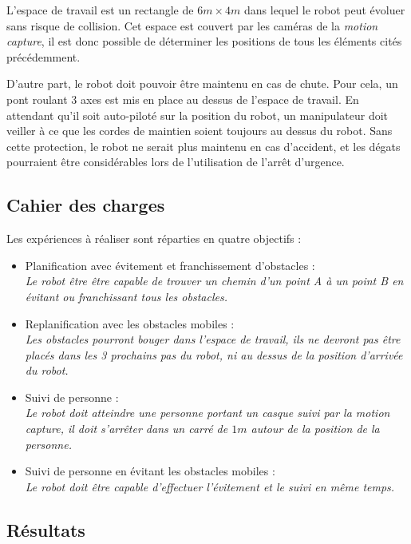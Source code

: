 L'espace de travail est un rectangle de $6m\times4m$ dans lequel le robot peut évoluer sans risque de collision. Cet espace est couvert par les caméras de la \emph{motion capture}, il est donc possible de déterminer les positions de tous les éléments cités précédemment. 

D'autre part, le robot doit pouvoir être maintenu en cas de chute. Pour cela, un pont roulant 3 axes est mis en place au dessus de l'espace de travail. En attendant qu'il soit auto-piloté sur la position du robot, un manipulateur doit veiller à ce que les cordes de maintien soient toujours au dessus du robot. Sans cette protection, le robot ne serait plus maintenu en cas d'accident, et les dégats pourraient être considérables lors de l'utilisation de l'arrêt d'urgence.

\subsection{Cahier des charges}
\label{sub:cdc}

Les expériences à réaliser sont réparties en quatre objectifs :
\begin{itemize}
\item Planification avec évitement et franchissement d'obstacles :\\
\emph{Le robot être être capable de trouver un chemin d'un point A à un point B en évitant ou franchissant tous les obstacles.}
\item Replanification avec les obstacles mobiles :\\
\emph{Les obstacles pourront bouger dans l'espace de travail, ils ne devront pas être placés dans les 3 prochains pas du robot, ni au dessus de la position d'arrivée du robot.}
\item Suivi de personne :\\
\emph{Le robot doit atteindre une personne portant un casque suivi par la \emph{motion capture}, il doit s'arrêter dans un carré de $1m$ autour de la position de la personne.}
\item Suivi de personne en évitant les obstacles mobiles :\\
\emph{Le robot doit être capable d'effectuer l'évitement et le suivi en même temps.}
\end{itemize}



\subsection{Résultats}
\label{sub:resultats}

